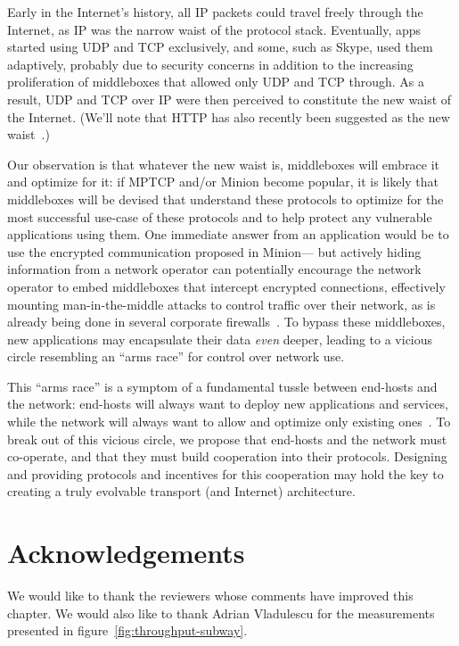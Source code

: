 Early in the Internet's history,
all IP packets could travel freely through the Internet, as IP was the narrow waist of
the protocol stack. 
Eventually, 
apps started using UDP and TCP exclusively,
and some, such as Skype, used them adaptively,
probably due to security concerns
in addition to the increasing proliferation of middleboxes that allowed only UDP and TCP through.
As a result, UDP and TCP over IP were then perceived to constitute the new waist of the Internet.
(We'll note that HTTP has also recently
been suggested as the new waist~\cite{popa10http}.) 

Our observation is that
whatever the new waist is,
middleboxes will embrace it and optimize for it: 
if MPTCP and/or Minion become popular, 
it is likely that middleboxes will be devised that understand these protocols
to optimize for the most successful use-case of these protocols
and to help protect any vulnerable applications using them.
One immediate answer from an application would be to
use the encrypted communication proposed in Minion---%
but actively hiding information from a network operator
can potentially encourage the network operator
to embed middleboxes that intercept encrypted connections,
effectively mounting man-in-the-middle attacks
to control traffic over their network,
as is already being done in several corporate firewalls~\cite{marko10using}.
To bypass these middleboxes,
new applications may encapsulate their data {\em even} deeper,
leading to a vicious circle resembling an ``arms race'' for control
over network use.

This ``arms race'' is a symptom of a fundamental tussle between
end-hosts and the network: end-hosts will always want to deploy new
applications and services, while the network will always want to allow and optimize only
existing ones~\cite{tussle}.
To break out of this vicious circle,
we propose that
end-hosts and the network must co-operate,
and that they must build cooperation into their protocols.
Designing and providing protocols and incentives for this cooperation may hold the key to creating a
truly evolvable transport (and Internet) architecture.


\section*{Acknowledgements}

We would like to thank the reviewers whose comments have improved this
chapter. We would also like to thank Adrian Vladulescu for the measurements presented in
figure~\ref{fig:throughput-subway}. 